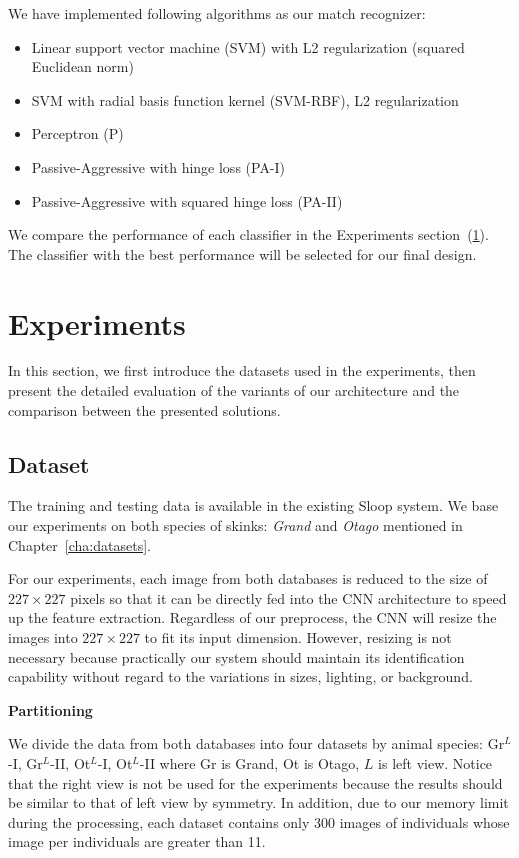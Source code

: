 We have implemented following algorithms as our match recognizer:
\begin{itemize}
  \item Linear support vector machine (SVM) with L2 regularization (squared
    Euclidean norm)
  \item SVM with radial basis function kernel (SVM-RBF), L2 regularization
  \item Perceptron (P)
  \item Passive-Aggressive with hinge loss (PA-I)
  \item Passive-Aggressive with squared hinge loss (PA-II)
\end{itemize}

We compare the performance of each classifier in the Experiments
section~(\ref{experiments}). The classifier with the best performance will be
selected for our final design.

\section{Experiments}\label{experiments}

In this section, we first introduce the datasets used in the experiments, then
present the detailed evaluation of the variants of our architecture and the
comparison between the presented solutions.

\subsection{Dataset}

The training and testing data is available in the existing Sloop system. We
base our experiments on both species of skinks: \emph{Grand} and \emph{Otago}
mentioned in Chapter~\ref{cha:datasets}.

For our experiments, each image from both databases is reduced to the size of
$227 \times 227$ pixels so that it can be directly fed into the CNN
architecture to speed up the feature extraction. Regardless of our preprocess,
the CNN will resize the images into $227 \times 227$ to fit its input
dimension. However, resizing is not necessary because practically our system
should maintain its identification capability without regard to the variations
in sizes, lighting, or background.

\textbf{Partitioning}

We divide the data from both databases into four datasets by animal species:
Gr$^{L}$-I, Gr$^{L}$-II, Ot$^{L}$-I, Ot$^{L}$-II where Gr is Grand, Ot is
Otago, $L$ is left view. Notice that the right view is not be used for the
experiments because the results should be similar to that of left view by
symmetry. In addition, due to our memory limit during the processing, each
dataset contains only 300 images of individuals whose image per individuals are
greater than 11.

